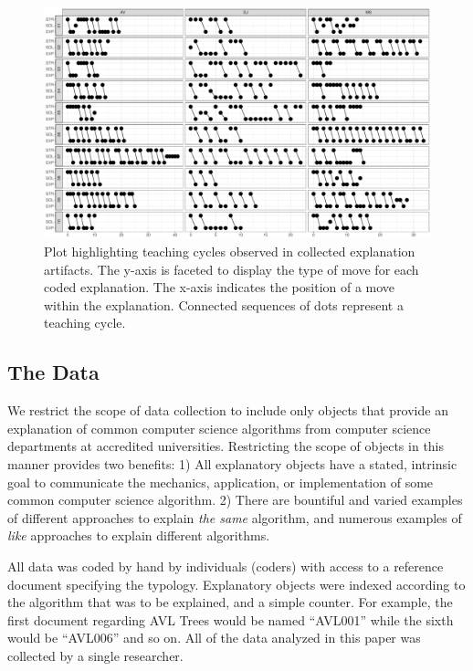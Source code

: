 \documentclass[conference]{IEEEtran}
\begin{document}
\begin{figure}
\centering
\includegraphics[width=\textwidth]{teachCyclesPltCombined}
\caption{Plot highlighting teaching cycles observed in collected explanation
artifacts. The y-axis is faceted to display the type of move for each coded
explanation. The x-axis indicates the position of a move within the
explanation. Connected sequences of dots represent a teaching cycle.}
\label{fig:cycles-plot}
\end{figure}

\subsection{The Data}
We restrict the scope of data collection to include only objects that provide an
explanation of common computer science algorithms from computer
science departments at accredited universities. Restricting the scope of objects
in this manner provides two benefits: 1) All explanatory objects have a stated,
intrinsic goal to communicate the mechanics, application, or implementation of
some common computer science algorithm. 2) There are bountiful and varied
examples of different approaches to explain \emph{the same} algorithm, and numerous
examples of \emph{like} approaches to explain different algorithms.

All data was coded by hand by individuals (coders) with access to a reference
document specifying the typology. Explanatory objects were indexed according to
the algorithm that was to be explained, and a simple counter. For example, the
first document regarding AVL Trees would be named ``AVL001'' while the sixth
would be ``AVL006'' and so on. All of the data analyzed in this paper was
collected by a single researcher. 
\end{document}
